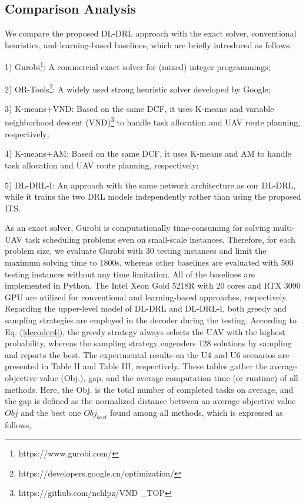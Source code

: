 \documentclass[lettersize,journal]{IEEEtran}
\begin{document}
	
	\subsection{Comparison Analysis}
	
	We compare the proposed DL-DRL approach with the exact solver, conventional heuristics, and learning-based baselines, which are briefly introduced as follows.
	
	1) Gurobi\footnote{https://www.gurobi.com/}: A commercial exact solver for (mixed) integer programmings; 
	
	2) OR-Tools\footnote{https://developers.google.cn/optimization/}: A widely used strong heuristic solver developed by Google;
	
	3) K-means+VND: Based on the same DCF, it uses K-means and variable neighborhood descent (VND)\footnote{https://github.com/nchlpz/VND \_TOP} to handle task allocation and UAV route planning, respectively;
	
	4) K-means+AM: Based on the same DCF, it uses K-means and AM \cite{koolATTENTIONLEARNSOLVE2019a} to handle task allocation and UAV route planning, respectively;
	
	5) DL-DRL-I: An approach with the same network architecture as our DL-DRL, while it trains the two DRL models independently rather than using the proposed ITS.
	
	As an exact solver, Gurobi is computationally time-consuming for solving multi-UAV task scheduling problems even on small-scale instances. Therefore, for each problem size, we evaluate Gurobi with 30 testing instances and limit the maximum solving time to 1800s, whereas other baselines are evaluated with 500 testing instances without any time limitation. All of the baselines are implemented in Python. The Intel Xeon Gold 5218R with 20 cores and RTX 3090 GPU are utilized for conventional and learning-based approaches, respectively.
	Regarding the upper-level model of DL-DRL and DL-DRL-I, both greedy and sampling strategies are employed in the decoder during the testing. According to Eq. (\ref{decoder4}), the greedy strategy always selects the UAV with the highest probability, whereas the sampling strategy engenders 128 solutions by sampling and reports the best. The experimental results on the U4 and U6 scenarios are presented in Table II and Table III, respectively. These tables gather the average objective value (Obj.), gap, and the average computation time (or runtime) of all methods. Here, the Obj. is the total number of completed tasks on average, and the gap is defined as the normalized distance between an average objective value $Obj$ and the best one $Ob{{j}_{best}}$ found among all methods, which is expressed as follows,
	
\end{document}
